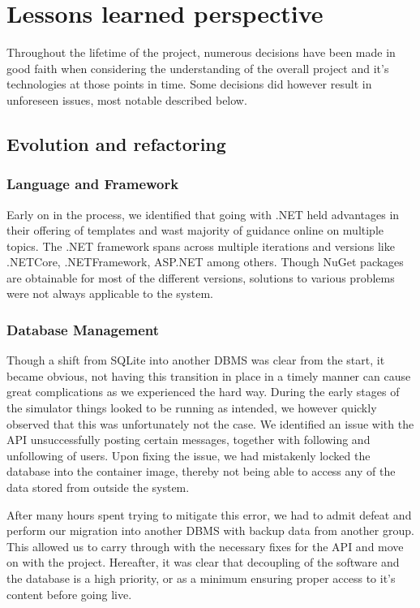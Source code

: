 \documentclass{article}
\begin{document}
\section{Lessons learned perspective}
Throughout the lifetime of the project, numerous decisions have been made in good faith when considering the understanding of the overall project and it's technologies at those points in time. Some decisions did however result in unforeseen issues, most notable described below.
\subsection{Evolution and refactoring} 
    \subsubsection{Language and Framework}
    Early on in the process, we identified that going with .NET held advantages in their offering of templates and wast majority of guidance online on multiple topics. The .NET framework spans across multiple iterations and versions  like .NETCore, .NETFramework, ASP.NET among others. Though NuGet packages are obtainable for most of the different versions, solutions to various problems were not always applicable to the system. %

    \subsubsection{Database Management}
    Though a shift from SQLite into another DBMS was clear from the start, it became obvious, not having this transition in place in a timely manner can cause great complications as we experienced the hard way.
    During the early stages of the simulator things looked to be running as intended, we however quickly observed that this was unfortunately not the case. We identified an issue with the API unsuccessfully posting certain messages, together with following and unfollowing of users. Upon fixing the issue, we had mistakenly locked the database into the container image, thereby not being able to access any of the data stored from outside the system. 
    
    After many hours spent trying to mitigate this error, we had to admit defeat and perform our migration into another DBMS with backup data from another group. This allowed us to carry through with the necessary fixes for the API and move on with the project. Hereafter, it was clear that decoupling of the software and the database is a high priority, or as a minimum ensuring proper access to it's content before going live. 
    
\end{document}
